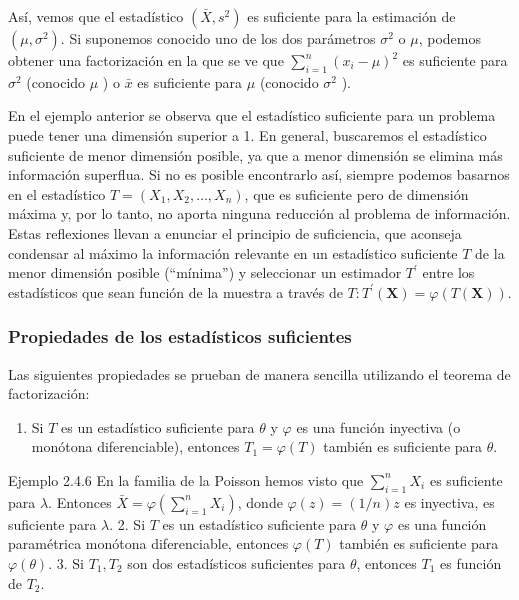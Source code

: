 \documentclass[
]{article}
\providecommand{\tightlist}{%
  \setlength{\itemsep}{0pt}\setlength{\parskip}{0pt}}
\begin{document}
Así, vemos que el estadístico \(\left(\bar{X}, s^{2}\right)\) es suficiente para la estimación de \(\left(\mu, \sigma^{2}\right)\).
Si suponemos conocido uno de los dos parámetros \(\sigma^{2}\) o \(\mu\), podemos obtener una factorización en la que se ve que \(\sum_{i=1}^{n}\left(x_{i}-\mu\right)^{2}\) es suficiente para \(\sigma^{2}\) (conocido \(\mu\) ) o \(\bar{x}\) es suficiente para \(\mu\) (conocido \(\sigma^{2}\) ).

En el ejemplo anterior se observa que el estadístico suficiente para un problema puede tener una dimensión superior a 1. En general, buscaremos el estadístico suficiente de menor dimensión posible, ya que a menor dimensión se elimina más información superflua. Si no es posible encontrarlo así, siempre podemos basarnos en el estadístico \(T=\left(X_{1}, X_{2}, \ldots, X_{n}\right)\), que es suficiente pero de dimensión máxima y, por lo tanto, no aporta ninguna reducción al problema de información. Estas reflexiones llevan a enunciar el principio de suficiencia, que aconseja condensar al máximo la información relevante en un estadístico suficiente \(T\) de la menor dimensión posible (``mínima'') y seleccionar un estimador \(T^{\prime}\) entre los estadísticos que sean función de la muestra a través de \(T: T^{\prime}(\mathbf{X})=\varphi(T(\mathbf{X}))\).

\subsubsection{Propiedades de los estadísticos suficientes}\label{propiedades-de-los-estaduxedsticos-suficientes}

Las siguientes propiedades se prueban de manera sencilla utilizando el teorema de factorización:

\begin{enumerate}
\def\labelenumi{\arabic{enumi}.}
\tightlist
\item
  Si \(T\) es un estadístico suficiente para \(\theta\) y \(\varphi\) es una función inyectiva (o monótona diferenciable), entonces \(T_{1}=\varphi(T)\) también es suficiente para \(\theta\).
\end{enumerate}

Ejemplo 2.4.6 En la familia de la Poisson hemos visto que \(\sum_{i=1}^{n} X_{i}\) es suficiente para \(\lambda\). Entonces \(\bar{X}=\varphi\left(\sum_{i=1}^{n} X_{i}\right)\), donde \(\varphi(z)=(1 / n) z\) es inyectiva, es suficiente para \(\lambda\).
2. Si \(T\) es un estadístico suficiente para \(\theta\) y \(\varphi\) es una función paramétrica monótona diferenciable, entonces \(\varphi(T)\) también es suficiente para \(\varphi(\theta)\).
3. Si \(T_{1}, T_{2}\) son dos estadísticos suficientes para \(\theta\), entonces \(T_{1}\) es función de \(T_{2}\).
\end{document}
